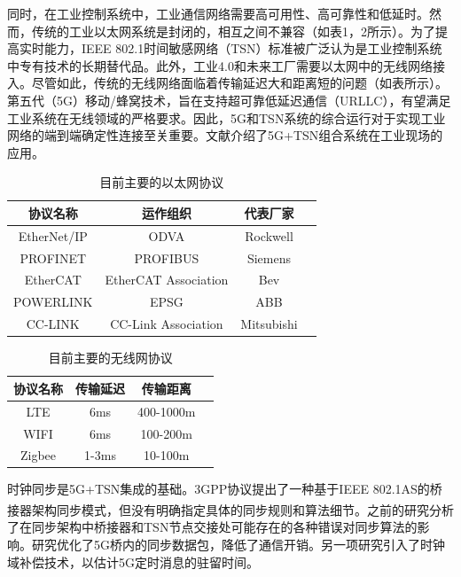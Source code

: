 \documentclass[UTF8,a4paper,12pt]{ctexart}
\numberwithin{equation}{section}
\begin{document}
同时，在工业控制系统中，工业通信网络需要高可用性、高可靠性和低延时。然而，传统的工业以太网系统是封闭的，相互之间不兼容（如表1，2所示）。为了提高实时能力，IEEE 802.1时间敏感网络（TSN）标准被广泛认为是工业控制系统中专有技术的长期替代品。此外，工业4.0和未来工厂需要以太网中的无线网络接入。尽管如此，传统的无线网络面临着传输延迟大和距离短的问题（如表所示）。第五代（5G）移动/蜂窝技术，旨在支持超可靠低延迟通信（URLLC），有望满足工业系统在无线领域的严格要求。因此，5G和TSN系统的综合运行对于实现工业网络的端到端确定性连接至关重要。文献\cite{zhang2022wireless}介绍了5G+TSN组合系统在工业现场的应用。
\begin{table}[!htbp]
	\centering
	\caption{目前主要的以太网协议}
	\begin{tabular}{|c| c|c|c|}
\hline
\textbf{协议名称}& \textbf{运作组织}& \textbf{代表厂家} \\
\hline
EtherNet/IP
& ODVA
& Rockwell \\
\hline
PROFINET
& PROFIBUS
& Siemens \\
\hline
EtherCAT
& EtherCAT Association
& Bev \\
\hline
POWERLINK
& EPSG
& ABB \\
\hline
CC-LINK
& CC-Link Association
& Mitsubishi \\
\hline
	\end{tabular}
\end{table}
\begin{table}[!htbp]
	\centering
	\caption{目前主要的无线网协议}
	\begin{tabular}{|c| c|c|c|}
\hline
\textbf{协议名称}& \textbf{传输延迟}& \textbf{传输距离} \\
\hline
LTE
& 6ms
& 400-1000m \\
\hline
WIFI
& 6ms
& 100-200m \\
\hline
Zigbee
& 1-3ms
& 10-100m \\
\hline
	\end{tabular}
\end{table}


时钟同步是5G+TSN集成的基础。3GPP协议提出了一种基于IEEE 802.1AS的桥接器架构同步模式，但没有明确指定具体的同步规则和算法细节\textsuperscript{\cite{888888}}。之前的研究\cite{9527833}分析了在同步架构中桥接器和TSN节点交接处可能存在的各种错误对同步算法的影响。研究\cite{9211936}优化了5G桥内的同步数据包，降低了通信开销。另一项研究\cite{9674640}引入了时钟域补偿技术，以估计5G定时消息的驻留时间。
\end{document}
